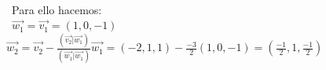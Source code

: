 \documentclass[preview]{standalone}
\begin{document}
\begin{center}
 \\\  Para ello hacemos: \\\  $\vec{w_1} = \vec{v_1} = (1, 0, -1)$  \newline $\vec{w_2} = \vec{v_2} - \frac{(\vec{v_2} | \vec{w_1})}{(\vec{w_1} | \vec{w_1})} \vec{w_1} = (-2, 1, 1) - \frac{-3}{2} (1, 0, -1) = (\frac{-1}{2}, 1, \frac{-1}{2} ) $ \newline
\end{center}
\end{document}
